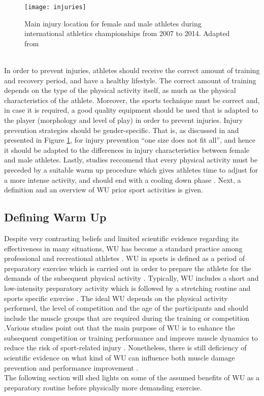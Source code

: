 \begin{figure}[h]
    \centering
    \texttt{[image: injuries]}
    \caption{Main injury location for female and male athletes during
international athletics championships from 2007 to 2014. Adapted from \cite{mayr2015prevention}}
    \label{fig:injuries}
\end{figure}\\
In order to prevent injuries, athletes should receive the correct amount of training and recovery period, and have a healthy lifestyle. The correct amount of training depends on the type of the physical activity itself, as much as the physical characteristics of the athlete. Moreover, the sports technique must be correct and, in case it is required, a good quality equipment should be used that is adapted to the player (morphology and level of play) in order to prevent injuries. Injury prevention strategies should be gender-specific. That is, as discussed in \cite{edouard2015sex} and presented in Figure \ref{fig:injuries}, for injury prevention ``one size does not fit all'', and hence it should be adapted to the differences in injury characteristics between female and male athletes. Lastly, studies reccomend that every physical activity must be preceded by a suitable warm up procedure which gives athletes time to adjust for a more intense activity, and should end with a cooling down phase \cite{mayr2015prevention}. Next, a definition and an overview of WU prior sport activities is given. %
\subsection{Defining Warm Up}
Despite very contrasting beliefs and limited scientific evidence regarding its effectiveness in many situations, WU has become a standard practice among professional and recreational athletes \cite{bishop2003warm1, bishop2003warm2, shellock1985warming}. WU in sports is defined as a period of preparatory exercise which is carried out in order to prepare the athlete for the demands of the subsequent physical activity  \cite{karvonen1992importance, woods2007warm, hedrick1992exercise}.
Typically, WU includes a short and low-intensity preparatory activity which is followed by a stretching routine and sports specific exercise \cite{safran1989warm}. 
The ideal WU depends on the physical activity performed,
the level of competition and the age of the participants and should include the muscle groups that are required during the training or competition
 \cite{mayr2015prevention}.Various studies point out that the main purpose of WU is to enhance the subsequent competition or training performance and improve muscle dynamics to reduce the risk of sport-related injury \cite{bishop2003warm1, shellock1985warming, knudson2008warm}. 
Nonetheless, there is still deficiency of scientific evidence on what kind of WU can influence both muscle damage prevention and performance improvement \cite{safran1989warm}.\\ The following section will shed lights on some of the assumed benefits of WU as a preparatory routine before physically more demanding exercise. 
